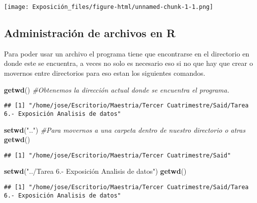 \documentclass[]{article}
\newenvironment{Shaded}{\begin{snugshade}}{\end{snugshade}}
\newcommand{\CommentTok}[1]{\textcolor[rgb]{0.56,0.35,0.01}{\textit{#1}}}
\newcommand{\KeywordTok}[1]{\textcolor[rgb]{0.13,0.29,0.53}{\textbf{#1}}}
\newcommand{\NormalTok}[1]{#1}
\newcommand{\StringTok}[1]{\textcolor[rgb]{0.31,0.60,0.02}{#1}}
\begin{document}
\texttt{[image: Exposición\_files/figure-html/unnamed-chunk-1-1.png]}

\hypertarget{administraciuxf3n-de-archivos-en-r}{%
\subsection{Administración de archivos en
R}\label{administraciuxf3n-de-archivos-en-r}}

Para poder usar un archivo el programa tiene que encontrarse en el
directorio en donde este se encuentra, a veces no solo es necesario eso
si no que hay que crear o movernos entre directorios para eso estan los
siguientes comandos.

\begin{Shaded}
\begin{Highlighting}[]
\KeywordTok{getwd}\NormalTok{() }\CommentTok{#Obtenemos la dirección actual donde se encuentra el programa.}
\end{Highlighting}
\end{Shaded}

\begin{verbatim}
## [1] "/home/jose/Escritorio/Maestria/Tercer Cuatrimestre/Said/Tarea 6.- Exposición Analisis de datos"
\end{verbatim}

\begin{Shaded}
\begin{Highlighting}[]
\KeywordTok{setwd}\NormalTok{(}\StringTok{".."}\NormalTok{) }\CommentTok{#Para movernos a una carpeta dentro de nuestro directorio o atras}
\KeywordTok{getwd}\NormalTok{()}
\end{Highlighting}
\end{Shaded}

\begin{verbatim}
## [1] "/home/jose/Escritorio/Maestria/Tercer Cuatrimestre/Said"
\end{verbatim}

\begin{Shaded}
\begin{Highlighting}[]
\KeywordTok{setwd}\NormalTok{(}\StringTok{"../Tarea 6.- Exposición Analisis de datos"}\NormalTok{)}
\KeywordTok{getwd}\NormalTok{()}
\end{Highlighting}
\end{Shaded}

\begin{verbatim}
## [1] "/home/jose/Escritorio/Maestria/Tercer Cuatrimestre/Said/Tarea 6.- Exposición Analisis de datos"
\end{verbatim}
\end{document}
